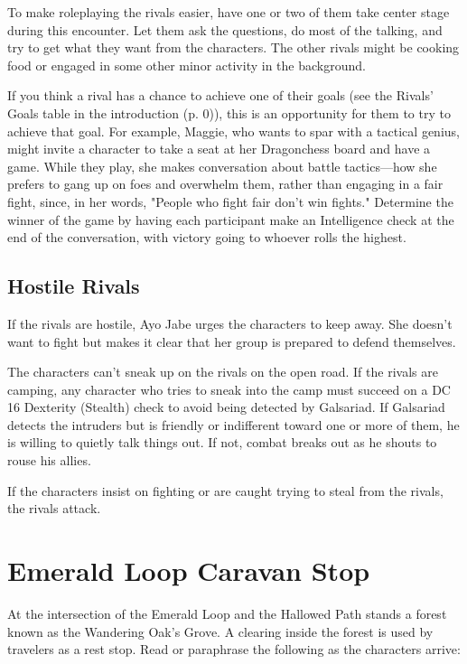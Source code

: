 \documentclass[a4paper, 11pt, bg=full, twocolumn, nooutline]{dndbook}
\begin{document}
To make roleplaying the rivals easier, have one or two of them take center stage during this encounter. Let them ask the questions, do most of the talking, and try to get what they want from the characters. The other rivals might be cooking food or engaged in some other minor activity in the background.

If you think a rival has a chance to achieve one of their goals (see the Rivals' Goals table in the introduction (p. 0)), this is an opportunity for them to try to achieve that goal. For example, Maggie, who wants to spar with a tactical genius, might invite a character to take a seat at her Dragonchess board and have a game. While they play, she makes conversation about battle tactics---how she prefers to gang up on foes and overwhelm them, rather than engaging in a fair fight, since, in her words, "People who fight fair don't win fights." Determine the winner of the game by having each participant make an Intelligence check at the end of the conversation, with victory going to whoever rolls the highest.

\subsection{Hostile Rivals}

If the rivals are hostile, Ayo Jabe urges the characters to keep away. She doesn't want to fight but makes it clear that her group is prepared to defend themselves.

The characters can't sneak up on the rivals on the open road. If the rivals are camping, any character who tries to sneak into the camp must succeed on a DC 16 Dexterity (Stealth) check to avoid being detected by Galsariad. If Galsariad detects the intruders but is friendly or indifferent toward one or more of them, he is willing to quietly talk things out. If not, combat breaks out as he shouts to rouse his allies.

If the characters insist on fighting or are caught trying to steal from the rivals, the rivals attack.
\section{Emerald Loop Caravan Stop}

At the intersection of the Emerald Loop and the Hallowed Path stands a forest known as the Wandering Oak's Grove. A clearing inside the forest is used by travelers as a rest stop. Read or paraphrase the following as the characters arrive:
\end{document}

